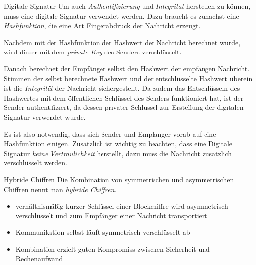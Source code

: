 \documentclass[german]{spicker}
\begin{document}
\begin{defi}{Digitale Signatur}
    Um auch \emph{Authentifizierung}
    und \emph{Integritat} herstellen zu können, muss eine digitale Signatur verwendet
    werden. Dazu braucht es zunachst eine \emph{Hashfunktion}, die eine Art Fingerabdruck
    der Nachricht erzeugt.

    Nachdem mit der Hashfunktion der Hashwert der Nachricht berechnet wurde, wird
    dieser mit dem \emph{private Key} des Senders verschlüsselt.

    Danach berechnet
    der Empfänger selbst den Hashwert der empfangen Nachricht. Stimmen der
    selbst berechnete Hashwert und der entschlüsselte Hashwert überein ist die \emph{Integrität} der Nachricht sichergestellt. Da zudem das Entschlüsseln des Hashwertes mit
    dem öffentlichen Schlüssel des Senders funktioniert hat, ist der Sender authentifiziert,
    da dessen privater Schlüssel zur Erstellung der digitalen Signatur verwendet
    wurde.

    Es ist also notwendig, dass sich Sender und Empfanger vorab auf eine
    Hashfunktion einigen. Zusatzlich ist wichtig zu beachten, dass eine Digitale Signatur
    \emph{keine Vertraulichkeit} herstellt, dazu muss die Nachricht zusatzlich verschlüsselt
    werden.
\end{defi}

\begin{defi}{Hybride Chiffren}
    Die Kombination von symmetrischen und asymmetrischen
    Chiffren nennt man \emph{hybride Chiffren}.

    \begin{itemize}
        \item verhältnismäßig kurzer Schlüssel einer Blockchiffre wird asymmetrisch verschlüsselt und zum Empfänger einer Nachricht transportiert
        \item Kommunikation selbst läuft symmetrisch verschlüsselt ab
        \item Kombination erzielt guten Kompromiss zwischen Sicherheit und Rechenaufwand
    \end{itemize}
\end{defi}
\end{document}
